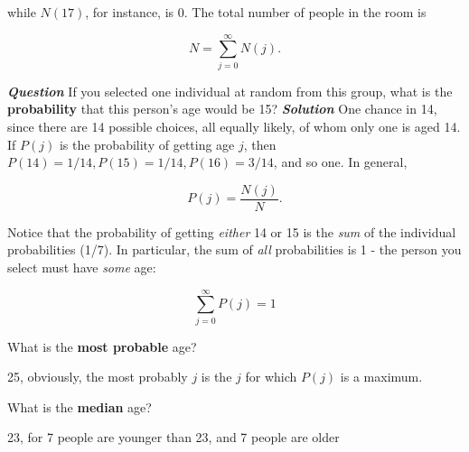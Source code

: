 \documentclass[svgnames]{article}   	%
\begin{document}
while $N(17)$, for instance, is 0. The total number of people in the room is 

\vspace{5px}\[
  N = \sum_{j=0}^{\infty} N(j). 
\] \vspace{5px}


\textbf{\textit{Question}} \vspace{10px} 
If you selected one individual at random from this group, what is the
\textbf{probability} that this person's age would be 15? \vspace{10px}
\textbf{\textit{Solution}} \vspace{10px}
One chance in 14, since there are 14 possible choices, all equally likely, of
whom only one is aged 14. If $P(j)$ is the probability of getting age $j$,
then $P(14) = 1/14, P(15) = 1/14, P(16) = 3/14$, and so one. In general, 

\vspace{5px}\[
P(j) = \frac{N(j)}{N}.
\] \vspace{5px} 

Notice that the probability of getting \textit{either} 14 or 15 is the
\textit{sum} of the individual probabilities (1/7). In particular, the sum of
\textit{all} probabilities is 1 - the person you select must have \textit{some}
age: 

\vspace{5px} \[
\sum_{j=0}^{\infty} P(j) =1
\] \vspace{5px}

\begin{tcolorbox}[colback = blue!5!white, colframe = blue!50!black, title
= Question]
What is the \textbf{most probable} age? 
\end{tcolorbox} 

\begin{tcolorbox}[colback = red!5!white, colframe = red!50!black, title
= Solution]
25, obviously, the most probably $j$ is the $j$ for which $P(j)$ is a maximum. 
\end{tcolorbox} 

\begin{tcolorbox}[colback = blue!5!white, colframe = blue!50!black, title
= Question]
What is the \textbf{median} age?   
\end{tcolorbox} 

\begin{tcolorbox}[colback = red!5!white, colframe = red!50!black, title
= Solution]
23, for 7 people are younger than 23, and 7 people are older  
\end{tcolorbox} 
\end{document}
